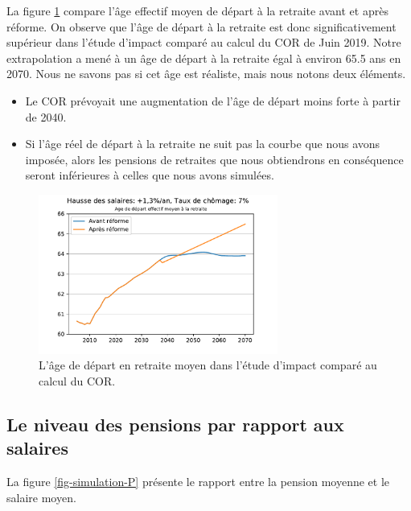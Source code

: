 \documentclass[10pt]{article}
\begin{document}
La figure \ref{fig-simulation-A-vs-COR} compare l'âge effectif moyen 
de départ à la retraite avant et après réforme. 
On observe que l'âge de départ à la retraite est donc 
significativement supérieur dans l'étude d'impact comparé au calcul du COR de Juin 2019. 
Notre extrapolation a mené à un âge de départ à la retraite égal à 
environ 65.5 ans en 2070. 
Nous ne savons pas si cet âge est réaliste, mais nous notons deux éléments. 
\begin{itemize}
\item Le COR prévoyait une augmentation de l'âge de départ moins 
forte à partir de 2040. 
\item Si l'âge réel de départ à la retraite ne suit pas la courbe 
que nous avons imposée, alors les pensions de retraites que nous 
obtiendrons en conséquence seront inférieures à celles que nous avons 
simulées. 
\end{itemize}

\begin{figure}
\begin{center}
\includegraphics[width=0.7\textwidth]{Simulation-vs-avant-reforme-Age.pdf}
\end{center}
\caption{L'âge de départ en retraite moyen dans l'étude d'impact comparé 
au calcul du COR.}
\label{fig-simulation-A-vs-COR}
\end{figure}



\subsection{Le niveau des pensions par rapport aux salaires}

La figure \ref{fig-simulation-P} présente le rapport entre la pension moyenne et le salaire moyen. 
\end{document}
